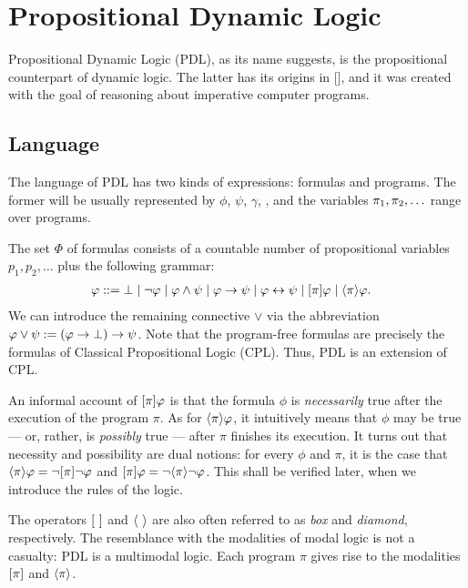 \section{Propositional Dynamic Logic}
Propositional Dynamic Logic (PDL), as its name suggests, is the propositional counterpart of dynamic logic. The latter has its origins in 
[], and it was created with the goal of reasoning about imperative computer programs.

\subsection{Language}

The language of PDL has two kinds of expressions: formulas and programs. The former will be usually represented by $\phi$, $\psi$, $\gamma$, \etc, and the variables $\pi_1, \pi_2, \ldots$ range over programs.

\begin{definition}
The set $\Phi$ of formulas consists of a countable number of propositional variables $p_1, p_2,\dots$ plus the following grammar:
%
\begin{align*}
    \varphi & \mathrel{::=} \bot \mid \lnot\varphi \mid \varphi \land \psi \mid \varphi \to \psi
    \mid \varphi \leftrightarrow  \psi\mid [\pi] \varphi \mid \langle \pi \rangle \varphi.
\end{align*}
We can introduce the remaining  connective $\lor$ via the abbreviation $\varphi \lor \psi \mathrel{:=} (\varphi \to \bot)\to \psi$. Note that the program-free formulas are precisely the formulas of Classical Propositional Logic (CPL). Thus, PDL is an extension of CPL.
\end{definition}

An informal account of $[\pi] \varphi$ is that the formula $\phi$ is \emph{necessarily} true after the execution of the program $\pi$. As for $\langle \pi \rangle \varphi$, it intuitively means that $\phi$ may be true --- or, rather, is \emph{possibly} true --- after $\pi$ finishes its execution. 
It turns out that necessity and possibility are dual notions: for every $\phi$ and $\pi$, it is the case that $\langle \pi \rangle \varphi = \lnot [\pi] \lnot \varphi$ and $[\pi] \varphi = \lnot \langle \pi \rangle \lnot \varphi$. This shall be verified later, when we introduce the rules of the logic.

The operators $[\ ]$ and $\langle \  \rangle$ are also often referred to as \emph{box} and \emph{diamond}, respectively. The resemblance with the modalities of modal logic is not a casualty: PDL is a multimodal logic. Each program $\pi$ gives rise to the modalities $[\pi]$ and $\langle \pi \rangle$.


